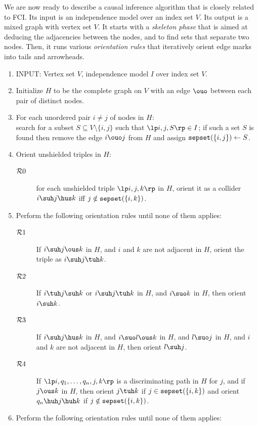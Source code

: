 We are now ready to describe a causal inference algorithm that is closely related to FCI.
Its input is an independence model over an index set $V$. Its output is a mixed graph with vertex set $V$.
It starts with a \emph{skeleton phase} that is aimed at deducing the adjacencies between the nodes, and to find sets that separate two nodes.
Then, it runs various \emph{orientation rules} that iteratively orient edge marks into tails and arrowheads.
\begin{enumerate}
  \item INPUT: Vertex set $V$, independence model $I$ over index set $V$.
  \item Initialize $H$ to be the complete graph on $V$ with an edge $\ouo$ between each pair of distinct nodes.
  \item For each unordered pair $i \ne j$ of nodes in $H$:\\
    search for a subset $S \subseteq V \setminus \{i,j\}$ such that $\lt i, j, S \rt \in I$;
    if such a set $S$ is found then remove the edge $i \ouo j$ from $H$ and assign $\mathtt{sepset}(\{i,j\}) \leftarrow S$.
  \item Orient unshielded triples in $H$:\label{alg:fci_R0}
    \begin{description}
    \item[$\mathcal{R}0$] for each unshielded triple $\lt i,j,k \rt$ in $H$, orient it as a collider $i \suh j \hus k$ iff $j \notin \mathtt{sepset}(\{i,k\})$.
    \end{description}
  \item Perform the following orientation rules until none of them applies:
    \begin{description}
      \item[$\mathcal{R}1$] If $i \suh j \ous k$ in $H$, and $i$ and $k$ are not adjacent in $H$, orient the triple as $i \suh j \tuh k$.
      \item[$\mathcal{R}2$] If $i \tuh j \suh k$ or $i \suh j \tuh k$ in $H$, and $i \suo k$ in $H$, then orient $i \suh k$.
      \item[$\mathcal{R}3$] If $i \suh j \hus k$ in $H$, and $i \suo l \ous k$ in $H$, and $l \suo j$ in $H$, and $i$ and $k$ are not adjacent in $H$, then orient $l \suh j$.
      \item[$\mathcal{R}4$] If $\lt i, q_1, \dots, q_n, j, k \rt$ is a discriminating path in $H$ for $j$, and if $j \ous k$ in $H$, then orient $j \tuh k$ if $j \in \mathtt{sepset}(\{i,k\})$ and orient $q_n \huh j \huh k$ if $j \notin \mathtt{sepset}(\{i,k\})$.
    \end{description}
  \item Perform the following orientation rules until none of them applies:

\end{enumerate}
